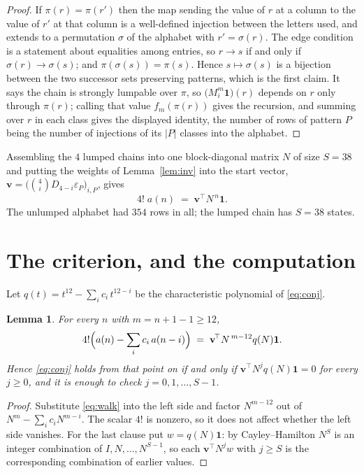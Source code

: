 \documentclass[11pt,a4paper]{article}
\theoremstyle{plain}
\newtheorem{lemma}[theorem]{Lemma}
\theoremstyle{definition}
\begin{document}
\begin{proof}
If $\pi(r)=\pi(r')$ then the map sending the value of $r$ at a column to the value of $r'$
at that column is a well-defined injection between the letters used, and extends to a
permutation $\sigma$ of the alphabet with $r'=\sigma(r)$. The edge condition is a statement
about equalities among entries, so $r\to s$ if and only if $\sigma(r)\to\sigma(s)$; and
$\pi(\sigma(s))=\pi(s)$. Hence $s\mapsto\sigma(s)$ is a bijection between the two successor
sets preserving patterns, which is the first claim. It says the chain is strongly lumpable
over $\pi$, so $\bigl(M_i^{m}\mathbf{1}\bigr)(r)$ depends on $r$ only through $\pi(r)$;
calling that value $f_m(\pi(r))$ gives the recursion, and summing over $r$ in each class
gives the displayed identity, the number of rows of pattern $P$ being the number of
injections of its $|P|$ classes into the alphabet.
\end{proof}

Assembling the $4$ lumped chains into one block-diagonal matrix $N$ of size $S=38$ and
putting the weights of Lemma~\ref{lem:inv} into the start vector,
$\mathbf{v}=\bigl(\binom{4}{i}D_{4-i}\varepsilon_P\bigr)_{i,P}$, gives
\begin{equation}\label{eq:walk}
4!\;a(n)\;=\;\mathbf{v}^{\!\top}N^{\,n}\mathbf{1} .
\end{equation}
The unlumped alphabet had $354$ rows in all; the lumped chain has $S=38$ states.

\section{The criterion, and the computation}

Let $q(t)=t^{12}-\sum_i c_i\,t^{12-i}$ be the characteristic polynomial of
\eqref{eq:conj}.

\begin{lemma}\label{lem:crit}
For every $n$ with $m=n+1-1\ge12$,
\[
4!\Bigl(a(n)-\sum_i c_i\,a(n-i)\Bigr)\;=\;\mathbf{v}^{\!\top}N^{\,m-12}q(N)\mathbf{1} .
\]
Hence \eqref{eq:conj} holds from that point on if and only if
$\mathbf{v}^{\!\top}N^{j}q(N)\mathbf{1}=0$ for every $j\ge0$, and it is enough to check
$j=0,1,\dots,S-1$.
\end{lemma}

\begin{proof}
Substitute \eqref{eq:walk} into the left side and factor $N^{m-12}$ out of
$N^{m}-\sum_i c_iN^{m-i}$. The scalar $4!$ is nonzero, so it does not affect whether
the left side vanishes. For the last clause put $w=q(N)\mathbf{1}$: by Cayley--Hamilton
$N^{S}$ is an integer combination of $I,N,\dots,N^{S-1}$, so each
$\mathbf{v}^{\!\top}N^{j}w$ with $j\ge S$ is the corresponding combination of earlier
values.
\end{proof}
\end{document}

